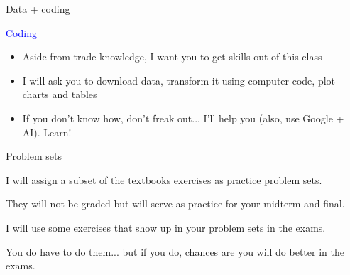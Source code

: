 \documentclass[notes,11pt, aspectratio=169, xcolor=table]{beamer}
\newenvironment{wideitemize}{\itemize\addtolength{\itemsep}{10pt}}{\enditemize}
\begin{document}
\begin{frame}{Data + coding}
\begin{wideitemize}
    \item \textcolor{blue}{Coding}
    \begin{itemize}
        \item Aside from trade knowledge, I want you to get skills out of this class
        \item I will ask you to download data, transform it using computer code, plot charts and tables
        \item If you don't know how, don't freak out... I'll help you (also, use Google + AI). Learn!
    \end{itemize}
\end{wideitemize}    
\end{frame}

\begin{frame}{Problem sets}
\begin{wideitemize}
    \item I will assign a subset of the textbooks exercises as practice problem sets.
    \item They will not be graded but will serve as practice for your midterm and final.
    \item I will use some exercises that show up in your problem sets in the exams.
    \item You do have to do them... but if you do, chances are you will do better in the exams.

\end{wideitemize}
    
\end{frame}
\end{document}
